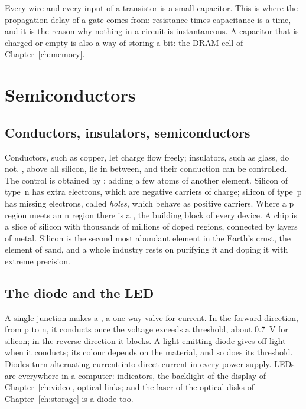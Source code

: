 Every wire and every input of a transistor is a small capacitor. This is
where the propagation delay of a gate comes from: resistance times
capacitance is a time, and it is the reason why nothing in a circuit is
instantaneous. A capacitor that is charged or empty is also a way of storing
a bit: the DRAM cell of Chapter~\ref{ch:memory}.

\section{Semiconductors}

\subsection{Conductors, insulators, semiconductors}

Conductors, such as copper, let charge flow freely; insulators, such as
glass, do not. , above all silicon, lie in between, and
their conduction can be controlled. The control is obtained by
: adding a few atoms of another element. Silicon of type~n has
extra electrons, which are negative carriers of charge; silicon of type~p has
missing electrons, called \emph{holes}, which behave as positive carriers.
Where a p region meets an n region there is a , the building
block of every device. A chip is a slice of silicon with thousands of
millions of doped regions, connected by layers of metal. Silicon is the
second most abundant element in the Earth's crust, the element of sand, and a
whole industry rests on purifying it and doping it with extreme precision.

\subsection{The diode and the LED}

A single junction makes a , a one-way valve for current. In the
forward direction, from p to n, it conducts once the voltage exceeds a
threshold, about 0.7~V for silicon; in the reverse direction it blocks. A
light-emitting diode gives off light when it conducts; its colour depends on
the material, and so does its threshold. Diodes turn alternating current into
direct current in every power supply. LEDs are everywhere in a computer:
indicators, the backlight of the display of Chapter~\ref{ch:video}, optical
links; and the laser of the optical disks of Chapter~\ref{ch:storage} is a
diode too.

